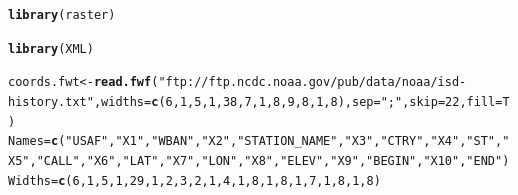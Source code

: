 \documentclass{article}\usepackage[]{graphicx}\usepackage[]{color}
\makeatletter
\newcommand{\hlnum}[1]{\textcolor[rgb]{0.686,0.059,0.569}{#1}}%
\newcommand{\hlstr}[1]{\textcolor[rgb]{0.192,0.494,0.8}{#1}}%
\newcommand{\hlstd}[1]{\textcolor[rgb]{0.345,0.345,0.345}{#1}}%
\newcommand{\hlkwb}[1]{\textcolor[rgb]{0.69,0.353,0.396}{#1}}%
\newcommand{\hlkwc}[1]{\textcolor[rgb]{0.333,0.667,0.333}{#1}}%
\newcommand{\hlkwd}[1]{\textcolor[rgb]{0.737,0.353,0.396}{\textbf{#1}}}%
\newenvironment{kframe}{%
 \def\at@end@of@kframe{}%
 \ifinner\ifhmode%
  \def\at@end@of@kframe{\end{minipage}}%
  \begin{minipage}{\columnwidth}%
 \fi\fi%
 \def\FrameCommand##1{\hskip\@totalleftmargin \hskip-\fboxsep
 \colorbox{shadecolor}{##1}\hskip-\fboxsep
     \hskip-\linewidth \hskip-\@totalleftmargin \hskip\columnwidth}%
 \MakeFramed {\advance\hsize-\width
   \@totalleftmargin\z@ \linewidth\hsize
   \@setminipage}}%
 {\par\unskip\endMakeFramed%
 \at@end@of@kframe}
\newenvironment{knitrout}{}{} %
\makeatother
\begin{document}
\begin{knitrout}
\color{fgcolor}\begin{kframe}
\begin{alltt}
\hlkwd{library}\hlstd{(raster)}
\end{alltt}


{\ttfamily\noindent\itshape\color{messagecolor}{\#\# Loading required package: sp\\\#\# \\\#\# Attaching package: 'raster'\\\#\# \\\#\# The following object is masked from 'package:dplyr':\\\#\# \\\#\#\ \ \ \  select\\\#\# \\\#\# The following object is masked from 'package:tidyr':\\\#\# \\\#\#\ \ \ \  extract}}\begin{alltt}
\hlkwd{library}\hlstd{(XML)}

\hlstd{coords.fwt} \hlkwb{<-} \hlkwd{read.fwf}\hlstd{(}\hlstr{"ftp://ftp.ncdc.noaa.gov/pub/data/noaa/isd-history.txt"}\hlstd{,}\hlkwc{widths}\hlstd{=}\hlkwd{c}\hlstd{(}\hlnum{6}\hlstd{,}\hlnum{1}\hlstd{,}\hlnum{5}\hlstd{,}\hlnum{1}\hlstd{,}\hlnum{38}\hlstd{,}\hlnum{7}\hlstd{,}\hlnum{1}\hlstd{,}\hlnum{8}\hlstd{,}\hlnum{9}\hlstd{,}\hlnum{8}\hlstd{,}\hlnum{1}\hlstd{,}\hlnum{8}\hlstd{),}\hlkwc{sep}\hlstd{=}\hlstr{";"}\hlstd{,}\hlkwc{skip}\hlstd{=}\hlnum{22}\hlstd{,}\hlkwc{fill}\hlstd{=T)}
\hlstd{Names} \hlkwb{=} \hlkwd{c}\hlstd{(}\hlstr{"USAF"}\hlstd{,} \hlstr{"X1"}\hlstd{,} \hlstr{"WBAN"}\hlstd{,} \hlstr{"X2"}\hlstd{,} \hlstr{"STATION_NAME"}\hlstd{,} \hlstr{"X3"}\hlstd{,} \hlstr{"CTRY"}\hlstd{,} \hlstr{"X4"}\hlstd{,} \hlstr{"ST"}\hlstd{,} \hlstr{"X5"}\hlstd{,} \hlstr{"CALL"}\hlstd{,} \hlstr{"X6"}\hlstd{,} \hlstr{"LAT"}\hlstd{,} \hlstr{"X7"}\hlstd{,} \hlstr{"LON"}\hlstd{,} \hlstr{"X8"}\hlstd{,} \hlstr{"ELEV"}\hlstd{,} \hlstr{"X9"}\hlstd{,} \hlstr{"BEGIN"}\hlstd{,} \hlstr{"X10"}\hlstd{,} \hlstr{"END"}\hlstd{)}
\hlstd{Widths} \hlkwb{=} \hlkwd{c}\hlstd{(}\hlnum{6}\hlstd{,}       \hlnum{1}\hlstd{,}    \hlnum{5}\hlstd{,}      \hlnum{1}\hlstd{,}        \hlnum{29}\hlstd{,}         \hlnum{1}\hlstd{,}    \hlnum{2}\hlstd{,}      \hlnum{3}\hlstd{,}    \hlnum{2}\hlstd{,}    \hlnum{1}\hlstd{,}    \hlnum{4}\hlstd{,}      \hlnum{1}\hlstd{,}    \hlnum{8}\hlstd{,}     \hlnum{1}\hlstd{,}     \hlnum{8}\hlstd{,}    \hlnum{1}\hlstd{,}    \hlnum{7}\hlstd{,}     \hlnum{1}\hlstd{,}     \hlnum{8}\hlstd{,}      \hlnum{1}\hlstd{,}    \hlnum{8}\hlstd{)}


\end{alltt}
\end{kframe}
\end{knitrout}
\end{document}
